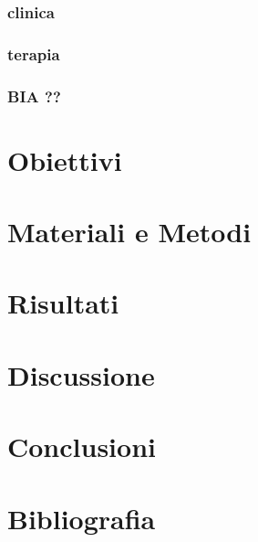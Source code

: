 \documentclass[11pt]{article}
\begin{document}
\subsubsection{clinica}
\label{sec:orgcd18c60}
\subsubsection{terapia}
\label{sec:org40c469a}
\subsubsection{BIA ??}
\label{sec:orgacb8e12}
\section{Obiettivi}
\label{sec:orgd0f34d8}

\section{Materiali e Metodi}
\label{sec:org9412551}

\section{Risultati}
\label{sec:org374a691}

\section{Discussione}
\label{sec:orgd235460}

\section{Conclusioni}
\label{sec:orge2fce37}


\section{Bibliografia}
\label{sec:org1e99842}
\end{document}
